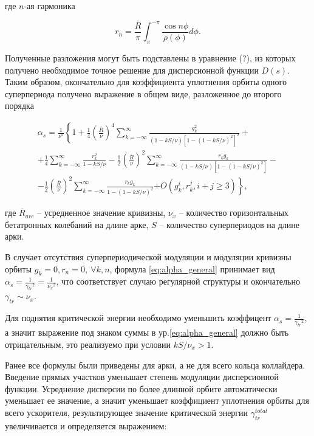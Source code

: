 \noindent где $n$-ая гармоника

\begin{equation}
r_n=\frac{\bar{R}}{\pi} \int_\pi^{-\pi} \frac{\cos n \phi}{\rho(\phi)} d \phi.
\end{equation}

\noindent Полученные разложения могут быть подставлены в уравнение (?), из которых получено необходимое точное решение для дисперсионной функции $D(s)$. Таким образом, окончательно для коэффициента уплотнения орбиты одного суперпериода получено выражение в общем виде, разложенное до второго порядка

\begin{equation}
\begin{gathered}
\alpha_s=\frac{1}{\nu^2}\left\{1+\frac{1}{4}\left(\frac{\bar{R}}{\nu}\right)^4 \sum_{k=-\infty}^{\infty}\right.
\frac{g_k^2}{(1-k S / \nu)\left[1-(1-k S / \nu)^2\right]^2}+ \\
+\frac{1}{4} \sum_{k=-\infty}^{\infty} \frac{r_k^2}{1-k S / \nu} -\frac{1}{2}\left(\frac{\bar{R}}{\nu}\right)^2 \sum_{k=-\infty}^{\infty} \frac{r_k g_k}{(1-k S / \nu)\left[1-(1-k S / \nu)^2\right]} - \\
-\frac{1}{2}\left(\frac{\bar{R}}{\nu}\right)^2 \sum_{k=-\infty}^{\infty} \frac{r_k g_k}{1-(1-k S / \nu)^2}
\left.+O\left(g_k^i, r_k^j, i+j \geq 3\right)\right\},
\end{gathered}
\label{eq:alpha_general}
\end{equation}

\noindent где ${\overline{R}}_{arc}$ -- усредненное значение кривизны, $\nu_{x}$ -- количество горизонтальных бетатронных колебаний на длине арке, $S$ -- количество суперпериодов на длине арки.

\noindent В случает отсутствия суперпериодической модуляции и модуляции кривизны орбиты $g_k=0, r_n=0, \  \forall k,n$, формула \ref{eq:alpha_general} принимает вид $\alpha_s=\frac{1}{{\gamma_{tr}}^2}=\frac{1}{{\nu_x}^2}$, что соответствует случаю регулярной структуры и окончательно  $\gamma_{tr}\sim\nu_x$.

\par Для поднятия критической энергии необходимо уменьшить коэффицент $\alpha_s=\frac{1}{{\gamma_{tr}}^2}$, а значит выражение под знаком суммы в ур.\ref{eq:alpha_general} должно быть отрицательным, это реализуемо при условии $kS/\nu_{x}>1$.

Ранее все формулы были приведены для арки, а не для всего кольца коллайдера. Введение прямых участков уменьшает степень модуляции дисперсионной функции. Усреднение дисперсии по более длинной орбите автоматически уменьшает ее значение, а значит уменьшает коэффициент уплотнения орбиты для всего ускорителя, результирующее значение критической энергии $\gamma_{tr}^{total}$ увеличивается и определяется выражением:

